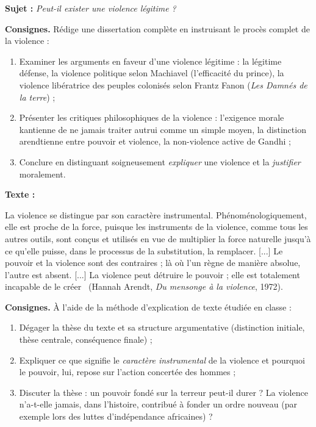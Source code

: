 \documentclass[11pt]{article}
\begin{document}
\begin{exercice}
\textbf{Sujet :} \emph{Peut-il exister une violence légitime ?}

\textbf{Consignes.} Rédige une dissertation complète en instruisant le procès complet de la violence :
\begin{enumerate}
\item Examiner les arguments en faveur d'une violence légitime : la légitime défense, la violence politique selon Machiavel (l'efficacité du prince), la violence libératrice des peuples colonisés selon Frantz Fanon (\emph{Les Damnés de la terre}) ;
\item Présenter les critiques philosophiques de la violence : l'exigence morale kantienne de ne jamais traiter autrui comme un simple moyen, la distinction arendtienne entre pouvoir et violence, la non-violence active de Gandhi ;
\item Conclure en distinguant soigneusement \emph{expliquer} une violence et la \emph{justifier} moralement.
\end{enumerate}
\end{exercice}

\begin{exercice}
\textbf{Texte :}

\guillemotleft La violence se distingue par son caractère instrumental. Phénoménologiquement, elle est proche de la force, puisque les instruments de la violence, comme tous les autres outils, sont conçus et utilisés en vue de multiplier la force naturelle jusqu'à ce qu'elle puisse, dans le processus de la substitution, la remplacer. [...] Le pouvoir et la violence sont des contraires ; là où l'un règne de manière absolue, l'autre est absent. [...] La violence peut détruire le pouvoir ; elle est totalement incapable de le créer \guillemotright\ (Hannah Arendt, \emph{Du mensonge à la violence}, 1972).

\textbf{Consignes.} À l'aide de la méthode d'explication de texte étudiée en classe :
\begin{enumerate}
\item Dégager la thèse du texte et sa structure argumentative (distinction initiale, thèse centrale, conséquence finale) ;
\item Expliquer ce que signifie le \emph{caractère instrumental} de la violence et pourquoi le pouvoir, lui, repose sur l'action concertée des hommes ;
\item Discuter la thèse : un pouvoir fondé sur la terreur peut-il durer ? La violence n'a-t-elle jamais, dans l'histoire, contribué à fonder un ordre nouveau (par exemple lors des luttes d'indépendance africaines) ?
\end{enumerate}
\end{exercice}
\end{document}
